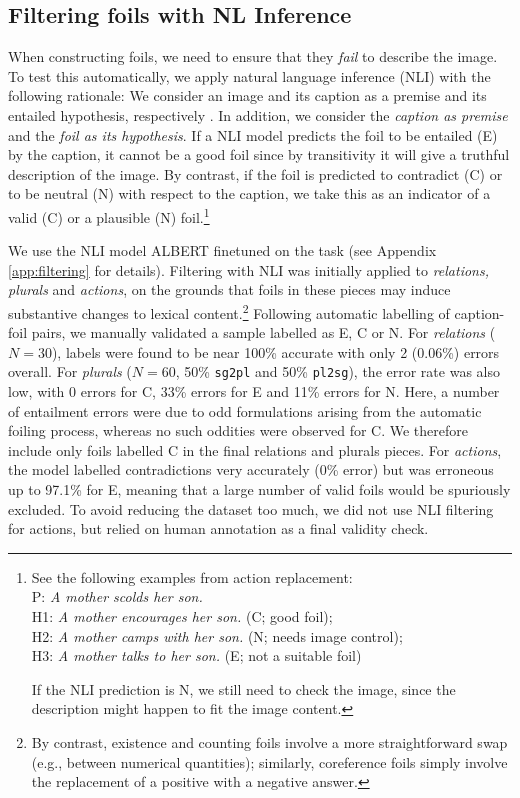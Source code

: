 \documentclass[11pt]{article}
\begin{document}
\subsection{Filtering foils with NL Inference} \label{subsec:nli}
When constructing foils, we need to ensure that they \textit{fail} to describe the image. To test this automatically, we apply natural language inference (NLI) with the following rationale: We consider an image and its caption as a premise and its entailed hypothesis, respectively \citep[a similar rationale is applied in the visual entailment task;][]{Xie2019}. In addition, we consider the \textit{caption as premise} and the \textit{foil as its hypothesis}. 
If a NLI model predicts the foil to be entailed (E) by the caption, it cannot be a good foil since by transitivity it will give a truthful description of the image. 
By contrast, if the foil is predicted to contradict (C) or to be neutral (N) with respect to the caption, we take this as an indicator of a valid
(C) or a plausible (N) foil.\footnote{See the following examples from action replacement:\\
P: \textit{A mother scolds her son.} \\
H1: \textit{A mother encourages her son.} (C; good foil);\\
H2: \textit{A mother camps with her son.} (N; needs image control);\\
H3: \textit{A mother talks to her son.} (E; not a suitable foil)


If the NLI prediction is N,  we still need to check the image, since the description might happen to fit the image content.} 

We use the NLI model ALBERT \cite{lan2019albert} finetuned on the task (see Appendix \ref{app:filtering} for details).
Filtering with NLI was initially applied to \textit{relations, plurals} and \textit{actions}, on the grounds that foils in these pieces 
may induce
substantive changes to lexical content.\footnote{By contrast, existence and counting foils involve a more straightforward swap (e.g., between numerical quantities); similarly, coreference foils simply involve the replacement of a positive with a negative answer.} Following automatic labelling of caption-foil pairs, we manually validated a sample 
labelled as E, C or N. For \textit{relations} ($N=30$), labels were found to be near 100\% accurate with only 2 (0.06\%) errors overall. For \textit{plurals} ($N=60$, 50\% {\tt sg2pl} and 50\% {\tt pl2sg}), the error rate was also low, with 0 errors for C, 33\% errors for E and 11\% errors for N. Here,
a number of entailment errors were due to odd formulations arising from the automatic foiling process, whereas no such oddities were observed for C. We therefore include only foils labelled C in the final relations and plurals pieces. For \textit{actions}, the model labelled contradictions very accurately (0\% error) but was erroneous up to 97.1\% for E, meaning that a large number of valid foils would be spuriously excluded. To avoid reducing the dataset too much, we did not use NLI filtering for actions, but relied on human annotation as a final validity check.
\end{document}
